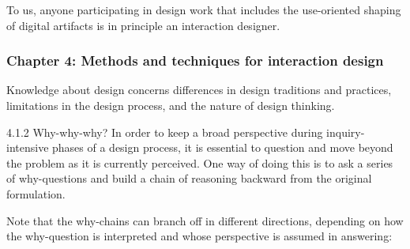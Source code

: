 
To us, anyone participating in design work that includes the use-oriented shaping of digital artifacts is in principle an interaction designer.

\subsubsection{Chapter 4: Methods and techniques for interaction design}
Knowledge about design concerns differences in design traditions and practices, limitations in the design process, and the nature of design thinking.

4.1.2 Why-why-why?
In order to keep a broad perspective during inquiry-intensive phases of a design process, it is essential to question and move beyond the problem as it is currently perceived. One way of doing this is to ask a series of why-questions and build a chain of reasoning backward from the original formulation.



Note that the why-chains can branch off in different directions, depending on how the why-question is interpreted and whose perspective is assumed in answering:


